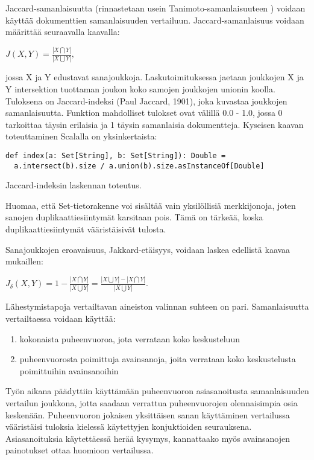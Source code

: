 \documentclass[11pt,a4paper,oneside]{memoir}
\begin{document}
Jaccard-samanlaisuutta (rinnastetaan usein Tanimoto-samanlaisuuteen \cite[s. 299]{encyclopedia-of-distances}) voidaan käyttää dokumenttien samanlaisuuden vertailuun. Jaccard-samanlaisuus voidaan määrittää seuraavalla kaavalla:

\begin{math}
J(X, Y) = \frac{| X \bigcap Y |}{| X \bigcup Y |},
\end{math}

jossa X ja Y edustavat sanajoukkoja. Laskutoimituksessa jaetaan joukkojen X ja Y intersektion tuottaman joukon koko samojen joukkojen unionin koolla. Tuloksena on Jaccard-indeksi (Paul Jaccard, 1901), joka kuvastaa joukkojen samanlaisuutta. Funktion mahdolliset tulokset ovat välillä 0.0 - 1.0, jossa 0 tarkoittaa täysin erilaisia ja 1 täysin samanlaisia dokumentteja. Kyseisen kaavan toteuttaminen Scalalla on yksinkertaista:

\begin{program}
  \begin{verbatim}
def index(a: Set[String], b: Set[String]): Double =
  a.intersect(b).size / a.union(b).size.asInstanceOf[Double]
  \end{verbatim}
  \caption{Jaccard-indeksin laskennan toteutus.}
\end{program}

Huomaa, että Set-tietorakenne voi sisältää vain yksilöllisiä merkkijonoja, joten sanojen duplikaattiesiintymät karsitaan pois. Tämä on tärkeää, koska duplikaattiesiintymät vääristäisivät tulosta.

Sanajoukkojen eroavaisuus, Jakkard-etäisyys, voidaan laskea edellistä kaavaa mukaillen:

\begin{math}
J_\delta(X, Y) = 1 - \frac{| X \bigcap Y |}{| X \bigcup Y |} = \frac{| X \bigcup Y | - | X \bigcap Y |}{| X \bigcup Y |}.
\end{math}

Lähestymistapoja vertailtavan aineiston valinnan suhteen on pari. Samanlaisuutta vertailtaessa voidaan käyttää:

\begin{enumerate}
\item kokonaista puheenvuoroa, jota verrataan koko keskusteluun
\item puheenvuorosta poimittuja avainsanoja, joita verrataan koko keskustelusta poimittuihin avainsanoihin
\end{enumerate}

Työn aikana päädyttiin käyttämään puheenvuoron asiasanoitusta samanlaisuuden vertailun joukkona, jotta saadaan verrattua puheenvuorojen olennaisimpia osia keskenään. Puheenvuoron jokaisen yksittäisen sanan käyttäminen vertailussa vääristäisi tuloksia kielessä käytettyjen konjuktioiden seurauksena. Asiasanoituksia käytettäessä herää kysymys, kannattaako myös avainsanojen painotukset ottaa huomioon vertailussa.
\end{document}
